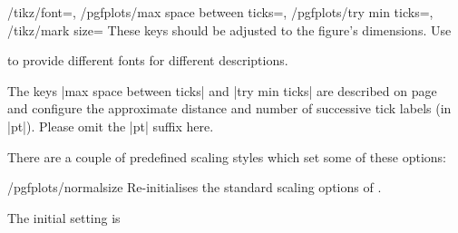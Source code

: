 \begin{keylist}{
	/tikz/font=,
	/pgfplots/max space between ticks=,
	/pgfplots/try min ticks=,
	/tikz/mark size=}
	These keys should be adjusted to the figure's dimensions. Use 
\begin{codeexample}
\end{codeexample}
	to provide different fonts for different descriptions.

	The keys |max space between ticks| and |try min ticks| are described on page~\pageref{maxspacebetweenticks} and configure the approximate distance and number of successive tick labels (in |pt|). Please omit the |pt| suffix here.
\end{keylist}

There are a couple of predefined scaling styles which set some of these options:

\begin{stylekey}{/pgfplots/normalsize}
	Re-initialises the standard scaling options of \PGFPlots.

\begin{codeexample}[]
\end{codeexample}

	The initial setting is
\begin{codeexample}
\end{codeexample}
\end{stylekey}

